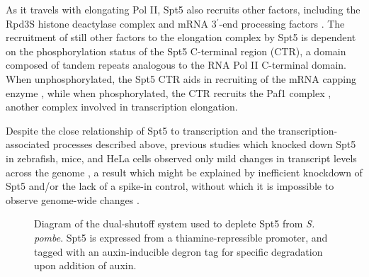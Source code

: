 As it travels with elongating Pol II, Spt5 also recruits other factors, including the Rpd3S histone deactylase complex \citep{drouin2010} and mRNA 3$^\prime$-end processing factors \citep{mayer2012, stadelmayer2014, yamamoto2014}.
The recruitment of still other factors to the elongation complex by Spt5 is dependent on the phosphorylation status of the Spt5 C-terminal region (CTR), a domain composed of tandem repeats analogous to the RNA Pol II C-terminal domain.
When unphosphorylated, the Spt5 CTR aids in recruiting of the mRNA capping enzyme \citep{doamekpor2014, doamekpor2015, schneider2010, wen1999}, while when phosphorylated, the CTR recruits the Paf1 complex \citep{liu2009, mbogning2013, wier2013, zhou2009}, another complex involved in transcription elongation.

Despite the close relationship of Spt5 to transcription and the transcription-associated processes described above, previous studies which knocked down Spt5 in zebrafish, mice, and HeLa cells observed only mild changes in transcript levels across the genome \citep{diamant2016b, komori2009, krishnan2008, stanlie2012}, a result which might be explained by inefficient knockdown of Spt5 and/or the lack of a spike-in control, without which it is impossible to observe genome-wide changes \citep{chen2016}.

\begin{wrapfigure}[11]{r}{3in}
    \caption[Diagram of the dual-shutoff system used to deplete Spt5 from \textit{S. pombe}]{Diagram of the dual-shutoff system used to deplete Spt5 from \textit{S. pombe}. Spt5 is expressed from a thiamine-repressible promoter, and tagged with an auxin-inducible degron tag for specific degradation upon addition of auxin.}
    \label{fig:five_depletion_diagram}
\end{wrapfigure}

